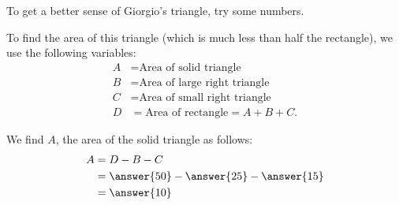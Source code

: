 \documentclass[nooutcomes,space,handout]{ximera}
\begin{document}
\begin{problem}
\begin{problem}
To get a better sense of Giorgio's triangle, try some numbers.  
\begin{image}
\end{image}
To find the area of this triangle (which is much less than half the rectangle), we use the following variables:   
\begin{align*}
A &= \textrm{Area of solid triangle} \\
B &= \textrm{Area of large right triangle} \\
C &= \textrm{Area of small right triangle} \\
D &= \textrm{Area of rectangle} = A + B + C.
\end{align*}

We find $A$, the area of the solid triangle as follows:  
\begin{align*}
A  &= D - B  - C \\
      &= \answer{50} - \answer{25} - \answer{15} \\
      &= \answer{10}
\end{align*}




\end{problem}
\end{problem}
\end{document}
